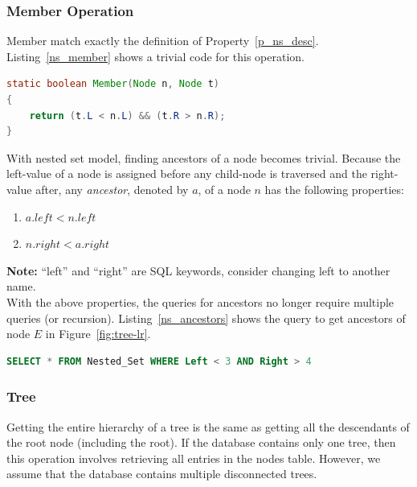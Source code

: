 
\subsubsection{Member Operation}

Member match exactly the definition of Property~\ref{p_ns_desc}. Listing~\ref{ns_member} shows a trivial code for this operation.

\begin{lstlisting}[language=java,style=java,caption={Member Operation},label=ns_member]
static boolean Member(Node n, Node t)
{
    return (t.L < n.L) && (t.R > n.R);
}
\end{lstlisting}

With nested set model, finding ancestors of a node becomes trivial. Because the left-value of a node is assigned before any child-node is traversed and the right-value after, any \emph{ancestor}, denoted by $a$, of a node $n$ has the following properties:

\begin{enumerate}
\item $a.left < n.left$
\item $n.right < a.right$
\end{enumerate}

\textbf{Note:} ``left'' and ``right'' are SQL keywords, consider changing left to another name.\\

With the above properties, the queries for ancestors no longer require multiple queries (or recursion). Listing~\ref{ns_ancestors} shows the query to get ancestors of node $E$ in Figure~\ref{fig:tree-lr}.

\begin{lstlisting}[language=sql,caption={Query for ancestors for node $E$ via nested set model},label=ns_ancestors]
SELECT * FROM Nested_Set WHERE Left < 3 AND Right > 4
\end{lstlisting}

\subsubsection{Tree}

Getting the entire hierarchy of a tree is the same as getting all the descendants of the root node (including the root). If the database contains only one tree, then this operation involves retrieving all entries in the nodes table. However, we assume that the database contains multiple disconnected trees.

